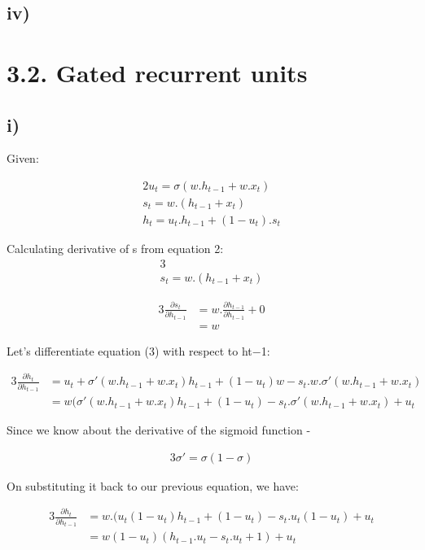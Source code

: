 \subsection*{iv)}


\section*{3.2. Gated recurrent units}
\subsection*{i)}

Given:

\begin{alignat}{2}
u_t = \sigma (w.h_{t-1} + w.x_t)
\\s_t = w. (h_{t-1} + x_t)
\\h_t = u_t. h_{t-1}  + (1-u_t) . s_t
\end{alignat}

Calculating derivative of s from equation 2:
\begin{alignat}{3}
\\s_t = w. (h_{t-1} + x_t)
\end{alignat}

\begin{alignat}{3}
\frac {\partial s_t}{\partial h_{t-1}} &= w.\frac{\partial h_{t-1}}{\partial h_{t-1}} + 0 
\\ &= w
\end{alignat}

Let's differentiate equation (3) with respect to ht−1:

\begin{alignat}{3}
\frac {\partial h_t}{\partial h_{t-1}} &= u_t +   \sigma'(w.h_{t-1}+w.x_t)h_{t-1} + (1-u_t)w - s_t.w.\sigma'(w.h_{t-1}+w.x_t)
\\ &= w(\sigma'(w.h_{t-1} + w.x_t)h_{t-1} + (1-u_t) - s_t.\sigma'(w.h_{t-1} + w.x_t) + u_t
\end{alignat}

Since we know about the derivative of the sigmoid function - 

\begin{alignat}{3}
\sigma' = \sigma(1-\sigma)
\end{alignat}

On substituting it back to our previous equation, we have:

\begin{alignat}{3}
\frac {\partial h_t}{\partial h_{t-1}} &= w.(u_t(1-u_t)h_{t-1} + (1-u_t) - s_t.u_t(1-u_t) +u_t
\\ &= w(1-u_t)(h_{t-1}.u_t-s_t.u_t +1) + u_t
\end{alignat}


